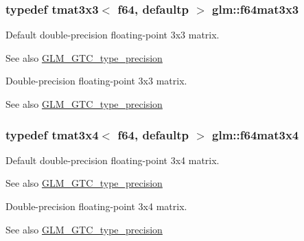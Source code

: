 \subsubsection[{f64mat3x3}]{\setlength{\rightskip}{0pt plus 5cm}typedef tmat3x3$<$ f64, defaultp $>$ {\bf glm\+::f64mat3x3}}\label{group__gtc__type__precision_gab272e67eb87cc1e8233237480c2aa8d2}
Default double-\/precision floating-\/point 3x3 matrix. \begin{DoxySeeAlso}{See also}
\hyperlink{group__gtc__type__precision}{G\+L\+M\+\_\+\+G\+T\+C\+\_\+type\+\_\+precision}
\end{DoxySeeAlso}
Double-\/precision floating-\/point 3x3 matrix. \begin{DoxySeeAlso}{See also}
\hyperlink{group__gtc__type__precision}{G\+L\+M\+\_\+\+G\+T\+C\+\_\+type\+\_\+precision} 
\end{DoxySeeAlso}
\hypertarget{group__gtc__type__precision_ga36436dae85fc187d4a20d68c4d660a10}{}
\subsubsection[{f64mat3x4}]{\setlength{\rightskip}{0pt plus 5cm}typedef tmat3x4$<$ f64, defaultp $>$ {\bf glm\+::f64mat3x4}}\label{group__gtc__type__precision_ga36436dae85fc187d4a20d68c4d660a10}
Default double-\/precision floating-\/point 3x4 matrix. \begin{DoxySeeAlso}{See also}
\hyperlink{group__gtc__type__precision}{G\+L\+M\+\_\+\+G\+T\+C\+\_\+type\+\_\+precision}
\end{DoxySeeAlso}
Double-\/precision floating-\/point 3x4 matrix. \begin{DoxySeeAlso}{See also}
\hyperlink{group__gtc__type__precision}{G\+L\+M\+\_\+\+G\+T\+C\+\_\+type\+\_\+precision} 
\end{DoxySeeAlso}
\hypertarget{group__gtc__type__precision_ga5bfcfa195cfe908fe50ecc15abbf7979}{}
